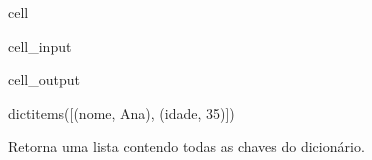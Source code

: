 \documentclass[letterpaper,10pt,english]{jupyterBook}
\begin{document}
\begin{sphinxuseclass}{cell}\begin{sphinxVerbatimInput}

\begin{sphinxuseclass}{cell_input}
\begin{sphinxVerbatim}[commandchars=\\\{\}]
     
  
\end{sphinxVerbatim}

\end{sphinxuseclass}\end{sphinxVerbatimInput}
\begin{sphinxVerbatimOutput}

\begin{sphinxuseclass}{cell_output}
\begin{sphinxVerbatim}[commandchars=\\\{\}]
dict\PYGZus{}items([(\PYGZsq{}nome\PYGZsq{}, \PYGZsq{}Ana\PYGZsq{}), (\PYGZsq{}idade\PYGZsq{}, 35)])
\end{sphinxVerbatim}

\begin{sphinxVerbatim}[commandchars=\\\{\}]

\end{sphinxVerbatim}

\end{sphinxuseclass}\end{sphinxVerbatimOutput}

\end{sphinxuseclass}
\sphinxAtStartPar
{}
Retorna uma lista contendo todas as chaves do dicionário.
\end{document}
